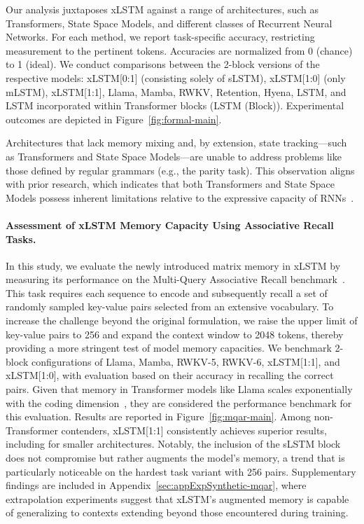 Our analysis juxtaposes xLSTM against a range of architectures, such as Transformers, State Space Models, and different classes of Recurrent Neural Networks. For each method, we report task-specific accuracy, restricting measurement to the pertinent tokens. Accuracies are normalized from 0 (chance) to 1 (ideal). We conduct comparisons between the 2-block versions of the respective models: xLSTM[0:1] (consisting solely of sLSTM), xLSTM[1:0] (only mLSTM), xLSTM[1:1], Llama, Mamba, RWKV, Retention, Hyena, LSTM, and LSTM incorporated within Transformer blocks (LSTM (Block)). Experimental outcomes are depicted in Figure~\ref{fig:formal-main}.

Architectures that lack memory mixing and, by extension, state tracking—such as Transformers and State Space Models—are unable to address problems like those defined by regular grammars (e.g., the parity task). This observation aligns with prior research, which indicates that both Transformers and State Space Models possess inherent limitations relative to the expressive capacity of RNNs~\citep{Merrill:24, Merrill:23, Deletang:23}.

\paragraph{Assessment of xLSTM Memory Capacity Using Associative Recall Tasks.} In this study, we evaluate the newly introduced matrix memory in xLSTM by measuring its performance on the Multi-Query Associative Recall benchmark~\citep{Arora:23arxiv}. This task requires each sequence to encode and subsequently recall a set of randomly sampled key-value pairs selected from an extensive vocabulary. To increase the challenge beyond the original formulation, we raise the upper limit of key-value pairs to 256 and expand the context window to 2048 tokens, thereby providing a more stringent test of model memory capacities. We benchmark 2-block configurations of Llama, Mamba, RWKV-5, RWKV-6, xLSTM[1:1], and xLSTM[1:0], with evaluation based on their accuracy in recalling the correct pairs. Given that memory in Transformer models like Llama scales exponentially with the coding dimension~\citep{Ramsauer:21}, they are considered the performance benchmark for this evaluation. Results are reported in Figure~\ref{fig:mqar-main}. 
Among non-Transformer contenders, xLSTM[1:1] consistently achieves superior results, including for smaller architectures. Notably, the inclusion of the sLSTM block does not compromise but rather augments the model's memory, a trend that is particularly noticeable on the hardest task variant with 256 pairs. Supplementary findings are included in Appendix~\ref{sec:appExpSynthetic-mqar}, where extrapolation experiments suggest that xLSTM's augmented memory is capable of generalizing to contexts extending beyond those encountered during training.

